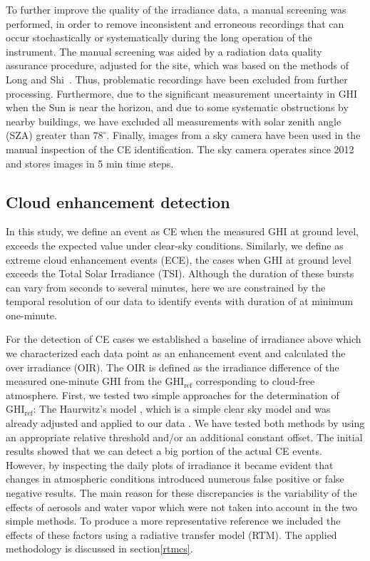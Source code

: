 \documentclass[preprint, 5p,
authoryear]{elsarticle} %
\begin{document}
To further improve the quality of the irradiance data, a manual
screening was performed, in order to remove inconsistent and erroneous
recordings that can occur stochastically or systematically during the
long operation of the instrument. The manual screening was aided by a
radiation data quality assurance procedure, adjusted for the site, which
was based on the methods of Long and Shi~\citep{Long2006, Long2008a}.
Thus, problematic recordings have been excluded from further processing.
Furthermore, due to the significant measurement uncertainty in GHI when
the Sun is near the horizon, and due to some systematic obstructions by
nearby buildings, we have excluded all measurements with solar zenith
angle (SZA) greater than \(78^\circ\). Finally, images from a sky camera
have been used in the manual inspection of the CE identification. The
sky camera operates since 2012 and stores images in 5 min time steps.

\hypertarget{cloud-enhancement-detection}{%
\subsection{Cloud enhancement
detection}\label{cloud-enhancement-detection}}

In this study, we define an event as CE when the measured GHI at ground
level, exceeds the expected value under clear-sky conditions. Similarly,
we define as extreme cloud enhancement events (ECE), the cases when GHI
at ground level exceeds the Total Solar Irradiance (TSI). Although the
duration of these bursts can vary from seconds to several minutes, here
we are constrained by the temporal resolution of our data to identify
events with duration of at minimum one-minute.

For the detection of CE cases we established a baseline of irradiance
above which we characterized each data point as an enhancement event and
calculated the over irradiance (OIR). The OIR is defined as the
irradiance difference of the measured one-minute GHI from the
\(\text{GHI}_\text{ref}\) corresponding to cloud-free atmosphere. First,
we tested two simple approaches for the determination of
\(\text{GHI}_\text{ref}\): The Haurwitz's model \citep{Haurwitz1945},
which is a simple clear sky model and was already adjusted and applied
to our data \citep{Natsis2023}. We have tested both methods by using an
appropriate relative threshold and/or an additional constant offset. The
initial results showed that we can detect a big portion of the actual CE
events. However, by inspecting the daily plots of irradiance it became
evident that changes in atmospheric conditions introduced numerous false
positive or false negative results. The main reason for these
discrepancies is the variability of the effects of aerosols and water
vapor which were not taken into account in the two simple methods. To
produce a more representative reference we included the effects of these
factors using a radiative transfer model (RTM). The applied methodology
is discussed in section\nobreakspace{}\ref{rtmcs}.
\end{document}
